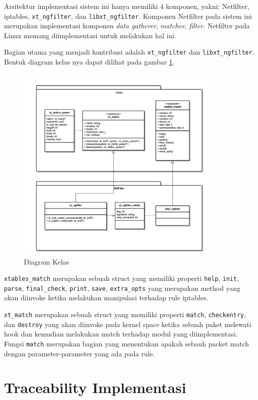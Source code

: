Arsitektur implementasi sistem ini hanya memiliki 4 komponen, yakni: Netfilter, iptables,  \verb|xt_ngfilter|, dan \verb|libxt_ngfilter|. Komponen Netfilter pada sistem ini merupakan implementasi komponen \textit{data gatherer}, \textit{matcher}, \textit{filter}. Netfilter pada Linux memang diimplementasi untuk melakukan hal ini.

Bagian utama yang menjadi kontribusi adalah \verb|xt_ngfilter| dan \verb|libxt_ngfilter|. Bentuk diagram kelas nya dapat dilihat pada gambar \ref{fig:class_diagram}.

\begin{figure}[H]
	\centering
	\includegraphics[width=370px]{resources/ngfilter_class_diagram.png}
	\caption{Diagram Kelas}
	\label{fig:class_diagram}
\end{figure}

\verb|xtables_match| merupakan sebuah struct yang memiliki properti \verb|help|, \verb|init|, \verb|parse|, \verb|final_check|, \verb|print|, \verb|save|, \verb|extra_opts| yang merupakan method yang akan diinvoke ketika melakukan manipulasi terhadap rule iptables.

\verb|xt_match| merupakan sebuah struct yang memiliki properti \verb|match|, \verb|checkentry|, dan \verb|destroy| yang akan diinvoke pada kernel space ketika sebuah paket melewati hook dan kemudian melakukan match terhadap modul yang diimplementasi. Fungsi \verb|match| merupakan bagian yang menentukan apakah sebauh packet match dengan parameter-parameter yang ada pada rule.


\section{Traceability Implementasi}


